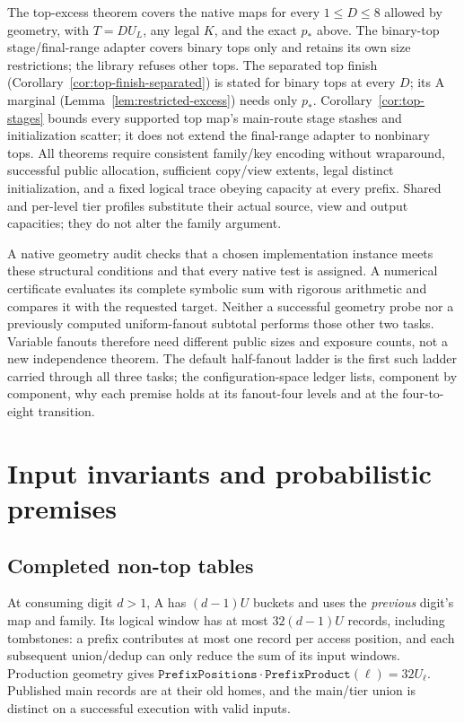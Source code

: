 \documentclass[11pt]{article}
\theoremstyle{definition}
\theoremstyle{remark}
\begin{document}
The top-excess theorem covers the native maps for every $1\le D\le8$
allowed by geometry, with $T=DU_L$, any legal $K$, and the exact $p_*$
above. The binary-top stage/final-range adapter covers
binary tops only and retains its own size restrictions; the library
refuses other tops. The separated top finish
(Corollary~\ref{cor:top-finish-separated}) is stated for binary tops at
every $D$; its A marginal (Lemma~\ref{lem:restricted-excess}) needs only
$p_*$. Corollary~\ref{cor:top-stages} bounds every supported top
map's main-route stage stashes and initialization scatter; it does not
extend the final-range adapter to nonbinary tops. All theorems require
consistent family/key encoding without wraparound, successful public
allocation, sufficient copy/view extents, legal distinct initialization,
and a fixed logical trace obeying capacity at every prefix. Shared and
per-level tier profiles substitute their actual source, view and output
capacities; they do not alter the family argument.

A native geometry audit checks that a chosen implementation instance meets
these structural conditions and that every native test is assigned. A
numerical certificate evaluates its complete symbolic sum with rigorous
arithmetic and compares it with the requested target. Neither a successful
geometry probe nor a previously computed uniform-fanout subtotal performs
those other two tasks. Variable fanouts therefore need different public
sizes and exposure counts, not a new independence theorem. The default
half-fanout ladder is the first such ladder carried through all three
tasks; the configuration-space ledger lists, component by component, why
each premise holds at its fanout-four levels and at the four-to-eight
transition.

\section{Input invariants and probabilistic premises}
\subsection{Completed non-top tables}
At consuming digit $d>1$, A has $(d-1)U$ buckets and uses the \emph{previous}
digit's map and family. Its logical window has at most $32(d-1)U$ records,
including tombstones: a prefix contributes at most one record per access
position, and each subsequent union/dedup can only reduce the sum of its
input windows. Production geometry gives
$\texttt{PrefixPositions}\cdot\texttt{PrefixProduct}(\ell)=32U_\ell$.
Published main records are at their old homes, and the main/tier union is
distinct on a successful execution with valid inputs.
\end{document}
